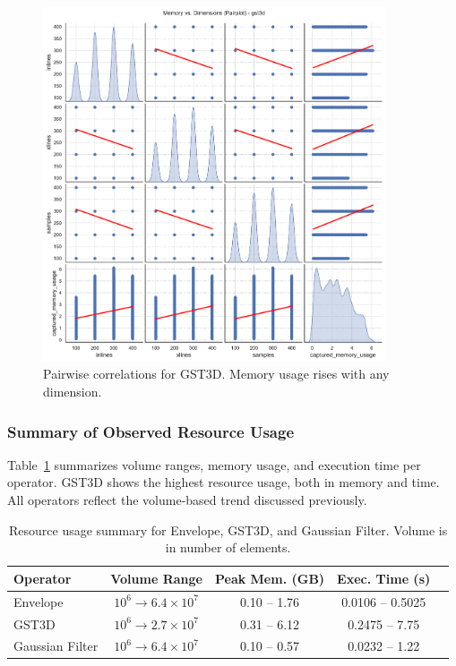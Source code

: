 \begin{figure}[htbp]
    \centering
    \includegraphics[width=0.9\textwidth]{assets/images/05/memory_vs_dimensions_pairplot_gst3d}
    \caption{Pairwise correlations for \ac{GST3D}. Memory usage rises with any dimension.}
    \label{fig:memory_vs_dimensions_pairplot_gst3d}
\end{figure}

\subsubsection{Summary of Observed Resource Usage}
\label{subsec:resource-usage-summary}

Table~\ref{tab:operator_summary_aggregates} summarizes volume ranges, memory usage, and execution time per operator.
\ac{GST3D} shows the highest resource usage, both in memory and time.
All operators reflect the volume-based trend discussed previously.

\begin{table}[htbp]
    \centering
    \begin{tabular}{lcccc}
        \hline
        \textbf{Operator} & \textbf{Volume Range}    & \textbf{Peak Mem. (GB)} & \textbf{Exec. Time (s)} \\
        \hline
        Envelope          & $10^6 \to 6.4\times10^7$ & 0.10 -- 1.76            & 0.0106 -- 0.5025        \\
        \ac{GST3D}        & $10^6 \to 2.7\times10^7$ & 0.31 -- 6.12            & 0.2475 -- 7.75          \\
        Gaussian Filter   & $10^6 \to 6.4\times10^7$ & 0.10 -- 0.57            & 0.0232 -- 1.22          \\
        \hline
    \end{tabular}
    \caption{Resource usage summary for Envelope, \ac{GST3D}, and Gaussian Filter. Volume is in number of elements.}
    \label{tab:operator_summary_aggregates}
\end{table}
